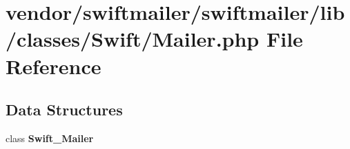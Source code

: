 \section{vendor/swiftmailer/swiftmailer/lib/classes/\+Swift/\+Mailer.php File Reference}
\label{swiftmailer_2swiftmailer_2lib_2classes_2_swift_2_mailer_8php}
\subsection*{Data Structures}
\begin{DoxyCompactItemize}
\item 
class {\bf Swift\+\_\+\+Mailer}
\end{DoxyCompactItemize}
